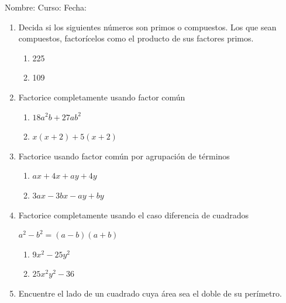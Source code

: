 \documentclass[letterpaper,fleqn]{article}
\newcommand{\LineaNombre}{%
\par
\vspace{\baselineskip}
Nombre:\hrulefill \; Curso: \underline{\hspace*{48pt}} \; Fecha: \underline{\hspace*{2.5cm}} \relax
\par}
\begin{document}
\LineaNombre
\begin{enumerate}
 \item Decida si los siguientes números son primos o compuestos. Los que sean compuestos, factorícelos como el producto de sus factores primos.
 \begin{enumerate}
 \item 225\noanswer
 \item 109 \noanswer
 \end{enumerate}
 \item Factorice completamente usando factor común
 \begin{enumerate}
 \item $18a^{2}b+27ab^{2}$\noanswer
 \item $x(x+2)+5(x+2)$\noanswer
 \end{enumerate}
 \item Factorice usando factor común por agrupación de términos
 \begin{enumerate}
 \item $ax+4x+ay+4y$\noanswer
 \item $3ax-3bx-ay+by$\noanswer
 \end{enumerate}
 \item Factorice completamente usando el caso diferencia de cuadrados
  \begin{center}
  $a^{2}-b^{2}=(a-b)(a+b)$
  \end{center}
\begin{enumerate}
\item $9x^{2}-25y^{2}$\noanswer
\item $25x^{2}y^{2}-36$\noanswer
\end{enumerate}
\item Encuentre el lado de un cuadrado cuya área sea el doble de su perímetro.\noanswer
 \end{enumerate}
\end{document}

